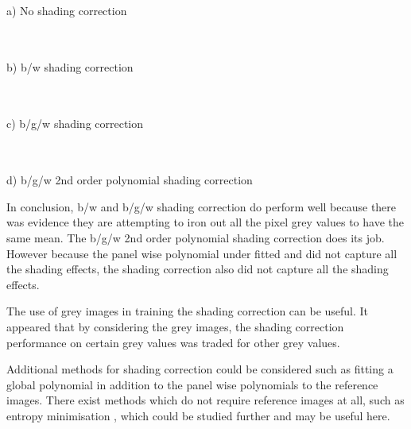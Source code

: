 \documentclass[a4paper]{proc}
\begin{document}
\begin{table*}
	\centering
	\begin{tabular}{c|c|c}
		
	\end{tabular}
	\\
	\vspace{.25cm}
	a) No shading correction
	\\\vspace{.5cm}
	\begin{tabular}{c|c|c}
		
	\end{tabular}
	\\
	\vspace{.25cm}
	b) b/w shading correction
	\\\vspace{.5cm}
	\begin{tabular}{c|c|c}
		
	\end{tabular}
	\\
	\vspace{.25cm}
	c) b/g/w shading correction
	\\\vspace{.5cm}
	\begin{tabular}{c|c|c}
		
	\end{tabular}
	\\
	\vspace{.25cm}
	d) b/g/w 2nd order polynomial shading correction
	\caption{Quartiles of the within pixel and between pixel variance after 20 repeats of the experiment.}
	\label{table:bgw_anova}
\end{table*}

In conclusion, b/w and b/g/w shading correction do perform well because there was evidence they are attempting to iron out all the pixel grey values to have the same mean. The b/g/w 2nd order polynomial shading correction does its job. However because the panel wise polynomial under fitted and did not capture all the shading effects, the shading correction also did not capture all the shading effects.

The use of grey images in training the shading correction can be useful. It appeared that by considering the grey images, the shading correction performance on certain grey values was traded for other grey values.

Additional methods for shading correction could be considered such as fitting a global polynomial in addition to the panel wise polynomials to the reference images. There exist methods which do not require reference images at all, such as entropy minimisation \cite{likar2000retrospective}, which could be studied further and may be useful here.
\end{document}
